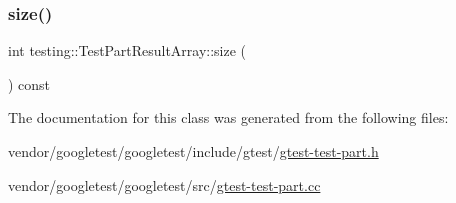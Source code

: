 \subsubsection{\texorpdfstring{size()}{size()}}
{\footnotesize\ttfamily int testing\+::\+Test\+Part\+Result\+Array\+::size (\begin{DoxyParamCaption}{ }\end{DoxyParamCaption}) const}



The documentation for this class was generated from the following files\+:\begin{DoxyCompactItemize}
\item 
vendor/googletest/googletest/include/gtest/\hyperlink{gtest-test-part_8h}{gtest-\/test-\/part.\+h}\item 
vendor/googletest/googletest/src/\hyperlink{gtest-test-part_8cc}{gtest-\/test-\/part.\+cc}\end{DoxyCompactItemize}
